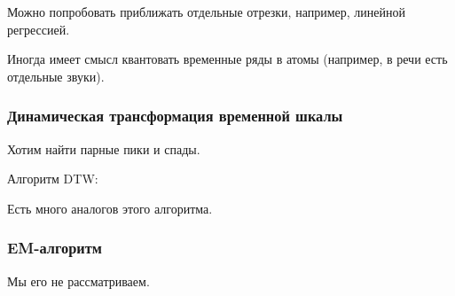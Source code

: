 \documentclass[main.tex]{subfiles}
\begin{document}
Можно попробовать приближать отдельные отрезки, например, линейной регрессией.

Иногда имеет смысл квантовать временные ряды в атомы (например, в речи есть отдельные звуки).

\subsubsection{Динамическая трансформация временной шкалы}

Хотим найти парные пики и спады.

Алгоритм DTW:


Есть много аналогов этого алгоритма.

\subsubsection{EM-алгоритм}

Мы его не рассматриваем.
\end{document}
